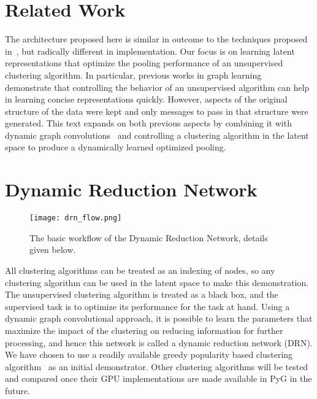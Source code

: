 \documentclass{article}
\begin{document}
\section{Related Work}

The architecture proposed here is similar in outcome to the techniques proposed in~\cite{diehl2019edge, lee2019selfattention}, but radically different in implementation.
Our focus is on learning latent representations that optimize the pooling performance of an unsupervised clustering algorithm.
In particular, previous works in graph learning~\cite{monti2016geometric,fey2017splinecnn} demonstrate that controlling the behavior of an unsupervised algorithm can help in learning concise representations quickly. 
However, aspects of the original structure of the data were kept and only messages to pass in that structure were generated.
This text expands on both previous aspects by combining it with dynamic graph convolutions~\cite{wang2018dynamic} and controlling a clustering algorithm in the latent space to produce a dynamically learned optimized pooling.

\section{Dynamic Reduction Network}

\begin{figure}[!hbt]
    \centering
    \texttt{[image: drn\_flow.png]}
    \caption{The basic workflow of the Dynamic Reduction Network, details given below.}
    \label{fig:drn_flow}
\end{figure}

All clustering algorithms can be treated as an indexing of nodes, so any clustering algorithm can be used in the latent space to make this demonstration.
The unsupervised clustering algorithm is treated as a black box, and the supervised task is to optimize its performance for the task at hand.
Using a dynamic graph convolutional approach,  it is possible to learn the parameters that maximize the impact of the clustering on reducing information for further processing, and hence this network is called a dynamic reduction network (DRN).
We have chosen to use a readily available greedy popularity based clustering algorithm~\cite{10.5555/2340646.2340660} as an initial demonstrator.
Other clustering algorithms will be tested and compared once their GPU implementations are made available in PyG in the future.
\end{document}
